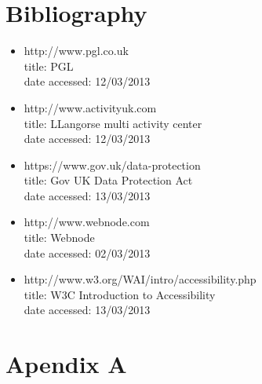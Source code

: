 \documentclass{article}
\begin{document}
\section{Bibliography}
\begin{itemize}
\item http://www.pgl.co.uk
\\title: PGL
\\date accessed: 12/03/2013

\item http://www.activityuk.com
\\title: LLangorse multi activity center
\\date accessed: 12/03/2013

\item https://www.gov.uk/data-protection
\\title: Gov UK Data Protection Act
\\date accessed: 13/03/2013

\item http://www.webnode.com
\\title: Webnode
\\date accessed: 02/03/2013

\item http://www.w3.org/WAI/intro/accessibility.php
\\title: W3C Introduction to Accessibility
\\date accessed: 13/03/2013

\end{itemize}
\newpage
\section{Apendix A}
\end{document}
